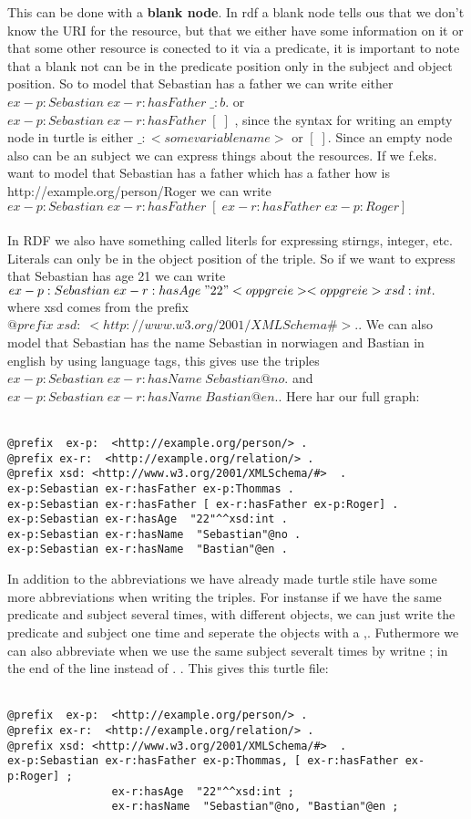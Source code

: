 This can be done with a \textbf{blank node}. In rdf a blank node tells ous that we don't know the URI for the resource, but that we either have some information 
on it or that some other resource is conected to it via a predicate, it is important to note that a blank not can be in the predicate position only in the subject and object
position. So to model that Sebastian has a father we can write either $ex-p:Sebastian\; ex-r:hasFather\; \_:b .$ or $ex-p:Sebastian\; ex-r:hasFather\; [\; ]$ , since the syntax 
for writing an empty node in turtle is either $\_:<some variable name>$ or $[\; ]$. Since an empty node also can be an subject we can express things about the resources. If we 
f.eks. want to model that Sebastian has a father which has a father how is http://example.org/person/Roger we can write $ex-p:Sebastian\; ex-r:hasFather\; [\; ex-r:hasFather\; ex-p:Roger]$
\\ \\ 
In RDF we also have something called literls for expressing stirngs, integer, etc. Literals can only be in the object position of the triple. 
So if we want to express that Sebastian has age 21 we can write $ex-p:Sebastian\; ex-r:hasAge\; " 22 " <opp greie> <opp greie> xsd:int.$ where xsd comes from the prefix
$@prefix\; xsd:\; <http://www.w3.org/2001/XMLSchema\#> .$. We can also model that Sebastian has the name Sebastian in norwiagen and Bastian in english by using 
language tags, this gives use the triples $ex-p:Sebastian\; ex-r:hasName\; Sebastian@no.$ and $ex-p:Sebastian\; ex-r:hasName\; Bastian@en.$. Here har our full 
graph:
\\ \\

\begin{lstlisting}[frame=single, language=turtle]
@prefix  ex-p:  <http://example.org/person/> . 
@prefix ex-r:  <http://example.org/relation/> . 
@prefix xsd: <http://www.w3.org/2001/XMLSchema/#>  . 
ex-p:Sebastian ex-r:hasFather ex-p:Thommas .
ex-p:Sebastian ex-r:hasFather [ ex-r:hasFather ex-p:Roger] . 
ex-p:Sebastian ex-r:hasAge  "22"^^xsd:int . 
ex-p:Sebastian ex-r:hasName  "Sebastian"@no . 
ex-p:Sebastian ex-r:hasName  "Bastian"@en .
\end{lstlisting}
In addition to the abbreviations we have already made turtle stile have some more abbreviations when writing the triples. For instanse if we have the same 
predicate and subject several times, with different objects, we can just write the predicate and subject one time and seperate the objects with a ,. Futhermore 
we can also abbreviate when we use the same subject severalt times by writne ; in the end of the line instead of . . This gives this turtle file:
\\ \\
\begin{lstlisting}[frame=single, language=turtle]
@prefix  ex-p:  <http://example.org/person/> . 
@prefix ex-r:  <http://example.org/relation/> . 
@prefix xsd: <http://www.w3.org/2001/XMLSchema/#>  . 
ex-p:Sebastian ex-r:hasFather ex-p:Thommas, [ ex-r:hasFather ex-p:Roger] ; 
                ex-r:hasAge  "22"^^xsd:int ; 
                ex-r:hasName  "Sebastian"@no, "Bastian"@en ;
\end{lstlisting}

